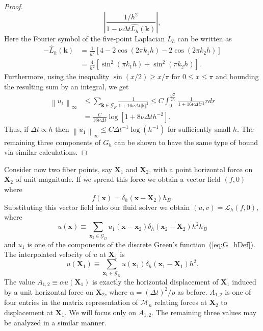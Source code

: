 \documentclass[preprint,12pt]{elsarticle}
\newcommand{\norm}[1]{\left\lVert#1\right\rVert}
\begin{document}
\begin{proof}
\begin{equation}
\left|\frac{1/h^2}
{1-\nu\Delta t \widehat{L_h}(\mathbf{k})}\right|,
\end{equation}
Here the Fourier symbol of the five-point Laplacian $L_h$ can be written as
\begin{equation}
\begin{split}
-\widehat{L}_h(\mathbf{k}) 
&=
\frac{1}{h^2}\left[
4 - 2\cos(2 \pi k_1h) - 2\cos(2 \pi k_2h)
\right] \\
&=
\frac{4}{h^2}\left[
\sin^2(\pi k_1h) + \sin^2(\pi k_2h)
\right].
\end{split}
\end{equation}
Furthermore, using the inequality $\sin (x/2) \geq x/\pi$ for $0 \leq x \leq \pi$ and bounding the resulting sum by an integral, we get
\begin{equation}
\begin{split}
\norm{u_1}_\infty &\leq
\sum_{\mathbf{k} \in \mathcal{G}_F }
\frac{1}{1 + 16\nu\Delta t |\mathbf{k}|^2}
\leq C \int_0^{\frac{\sqrt{2} }{2h}}\frac{1}{1 + 16\nu\Delta t r^2}rdr \\
&= \frac{C}{16 \nu \Delta t} \log[ 1 + 8 \nu \Delta t h^{-2}].
\end{split}
\end{equation}
Thus, if $\Delta t \propto h$ then $\norm{u_1}_\infty \leq C {\Delta t}^{-1}\log(h^{-1})$ for sufficiently small $h$.
The remaining three components of $G_h$ can be shown to have the same type of bound via similar calculations.
\end{proof}

Consider now two fiber points, say $\mathbf{X}_1$ and $\mathbf{X}_2$, with a point horizontal force on $\mathbf{X}_2$ of unit magnitude. If we spread this force we obtain a vector field $(f,0)$ where
\begin{equation}
f(\mathbf{x}) = \delta_h(\mathbf{x} - \mathbf{X}_2)h_B.
\end{equation}
Substituting this vector field into our fluid solver we obtain $(u,v)=\mathcal{L}_h(f,0)$, where
\begin{equation}
u(\mathbf{x}) \equiv
\sum_{\mathbf{x}_2\in\mathcal{G}_\Omega}
u_1(\mathbf{x}-\mathbf{x}_2)\delta_h(\mathbf{x}_2-\mathbf{X}_2)h^2h_B \label{eq:ux}
\end{equation}
and $u_1$ is one of the components of the discrete Green's function~(\ref{eq:G_hDef}). 
The interpolated velocity of $u$ at $\mathbf{X}_1$ is
\begin{equation}
u(\mathbf{X}_1) \equiv
\sum_{\mathbf{x}_1\in\mathcal{G}_\Omega}
u(\mathbf{x}_1)\delta_h(\mathbf{x}_1 - \mathbf{X}_1)h^2. \label{eq:uX1}
\end{equation}
The value $A_{1,2} \equiv \alpha u(\mathbf{X}_1)$ is exactly the horizontal displacement of $\mathbf{X}_1$ induced by a unit horizontal force on $\mathbf{X}_2$, where $\alpha = ({\Delta t})^2/\rho$ as before. $A_{1,2}$ is one of four entries in the matrix representation of $\mathcal{M}_n$ relating forces at $\mathbf{X}_2$ to displacement at $\mathbf{X}_1$. We will focus only on $A_{1,2}$. The remaining three values may be analyzed in a similar manner.
\end{document}
